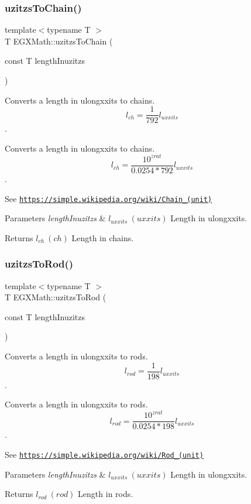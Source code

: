 \subsubsection{\texorpdfstring{uzitzs\+To\+Chain()}{uzitzsToChain()}}
{\footnotesize\ttfamily template$<$typename T $>$ \\
T E\+G\+X\+Math\+::uzitzs\+To\+Chain (\begin{DoxyParamCaption}\item[{const T}]{length\+Inuzitzs }\end{DoxyParamCaption})}



Converts a length in ulongxxits to chains. \[ l_{ch}= \frac{1}{792} l_{uxxits} \]. 

Converts a length in ulongxxits to chains. \[ l_{ch}= \frac{10^{zrat}}{0.0254 * 792} l_{uxxits} \].

See \href{https://simple.wikipedia.org/wiki/Chain_(unit)}{\tt https\+://simple.\+wikipedia.\+org/wiki/\+Chain\+\_\+(unit)} 
\begin{DoxyParams}{Parameters}
{\em length\+Inuzitzs} & $ l_{uxxits}\ (uxxits)$ Length in ulongxxits. \\
\hline
\end{DoxyParams}
\begin{DoxyReturn}{Returns}
$ l_{ch}\ (ch)$ Length in chains. 
\end{DoxyReturn}
\mbox{\label{group___e_g_x_math-_conversions-_length_conversions-uzitzs-_surveyors_gaf6062ab067930d296074de9e8301871d}} 
\subsubsection{\texorpdfstring{uzitzs\+To\+Rod()}{uzitzsToRod()}}
{\footnotesize\ttfamily template$<$typename T $>$ \\
T E\+G\+X\+Math\+::uzitzs\+To\+Rod (\begin{DoxyParamCaption}\item[{const T}]{length\+Inuzitzs }\end{DoxyParamCaption})}



Converts a length in ulongxxits to rods. \[ l_{rod}= \frac{1}{198} l_{uxxits} \]. 

Converts a length in ulongxxits to rods. \[ l_{rod}= \frac{10^{zrat}}{0.0254 * 198} l_{uxxits} \].

See \href{https://simple.wikipedia.org/wiki/Rod_(unit)}{\tt https\+://simple.\+wikipedia.\+org/wiki/\+Rod\+\_\+(unit)} 
\begin{DoxyParams}{Parameters}
{\em length\+Inuzitzs} & $ l_{uxxits}\ (uxxits)$ Length in ulongxxits. \\
\hline
\end{DoxyParams}
\begin{DoxyReturn}{Returns}
$ l_{rod}\ (rod)$ Length in rods. 
\end{DoxyReturn}
